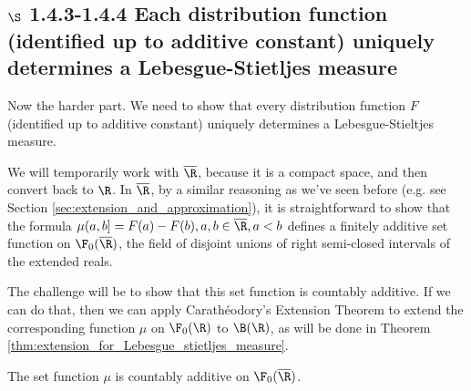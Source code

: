 \documentclass{article} %
\begin{document}
  \subsection{$\S$ 1.4.3-1.4.4 Each distribution function (identified up to additive constant) uniquely determines a Lebesgue-Stietljes measure }
  
 Now the harder part.  We need to show that every distribution function $F$ (identified up to additive constant) uniquely determines a Lebesgue-Stieltjes  measure.  
 
 We will temporarily work with $\overline{\R}$, because it is a compact space, and then convert back to $\R$.  In $\overline{\R}$, by a similar reasoning as we've seen before (e.g. see Section \ref{sec:extension_and_approximation}), it is straightforward to show that the formula $\mu(a,b] = F(a)-F(b), a,b \in \overline{\R}, a <b$ defines a finitely additive set function on $\F_0(\overline{\R})$, the field of disjoint unions of right semi-closed intervals of the extended reals.  
 
 The challenge will be to show that this set function is countably additive.  If we can do that, then we can apply Carath\'eodory's Extension Theorem to extend the corresponding function $\mu$ on $\F_0(\R)$ to $\B(\R)$, as will be done in Theorem \ref{thm:extension_for_Lebesgue_stietljes_measure}. 

\begin{lemma}
The set function $\mu$ is countably additive on $\F_0(\overline{\R})$.
\label{lemma:ls_measures_are_countably_additive_on_the_field_of_disjoint_rsc_intervals} 	
\end{lemma}
\end{document}
